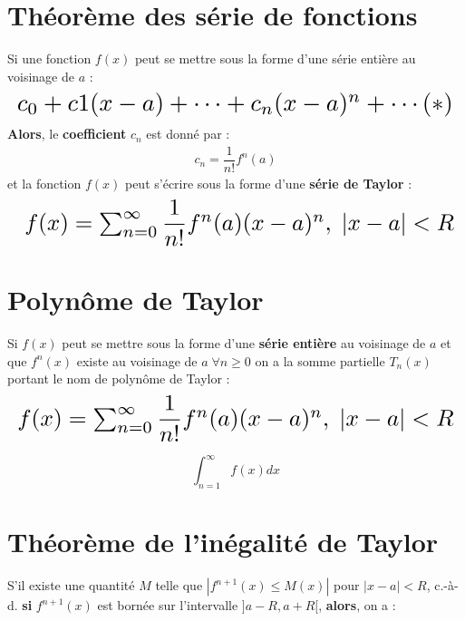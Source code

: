 \documentclass{report}
\begin{document}
\begin{multicols*}{3}
    \section{Théorème des série de fonctions}
        Si une fonction \( f(x) \) peut se mettre sous la forme d'une série entière 
        au voisinage de \( a \) :
        \begin{align*}
        \resizebox{\linewidth}{!}{$
            c_0 + c1(x - a) +  \cdots + c_n (x - a)^n + \cdots (*)
        $}
        \end{align*}
        \textbf{Alors}, le \textcolor{myb}{\textbf{coefficient }} 
        \( c_n \) est donné par : 
        \begin{align*}
            c_n = \dfrac{1}{n!}f^{n}(a) 
        \end{align*}
        et la fonction \( f(x) \) peut s'écrire sous la forme d'une 
        \textcolor{myb}{\textbf{série de Taylor }}: 
        \begin{align*}
            \resizebox{\linewidth}{!}{ $
            f(x) = \sum_{n= 0}^{\infty }\dfrac{1}{n!}f^{n}(a)(x - a)^n, \; |x - a| < R 
        $}
        \end{align*}

    \section{Polynôme de Taylor}
    Si \( f(x) \) peut se mettre sous la forme d'une \textbf{série entière} au voisinage de 
    \( a \) et que \( f^{n}(x) \) existe au voisinage de \( a  \; \forall n \geq 0\) on 
    a la somme partielle \( T_n(x) \) portant le nom de polynôme de Taylor : 
    \begin{align*}
        \resizebox{\linewidth}{!}{$
            f(x) = \sum_{n=0}^{\infty }\dfrac{1}{n!}f^{n}(a)(x - a)^n, \; |x - a| < R
        $}
    \end{align*}            

    $$\int_{n=1}^{\infty }f(x)dx$$

     \section{Théorème de l'inégalité de Taylor}

     S'il existe une quantité $M$ telle que 
     $\left| f^{n+1}(x) \leq M(x) \right|$ pour 
     $|x - a| < R$, c.-à-d. \textbf{si}  
     $f^{n+1}(x)$ est bornée sur l'intervalle 
     $]a - R, a + R[$, \textbf{alors}, on a : 


\end{multicols*}
\end{document}
